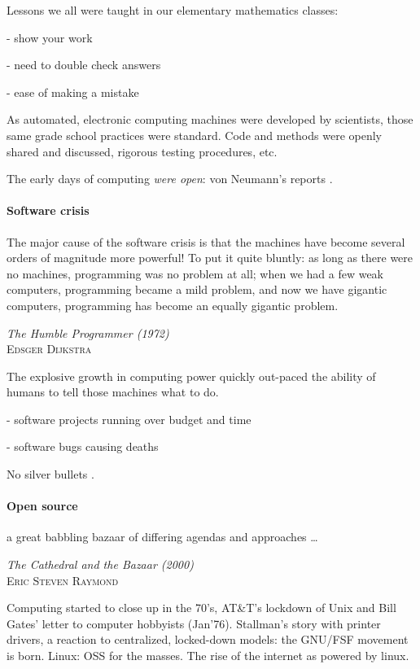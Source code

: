 \documentclass[ChapterTOCs,krantz2]{krantz} %
\begin{document}
Lessons we all were taught in our elementary mathematics classes:

- show your work

- need to double check answers

- ease of making a mistake

As automated, electronic computing machines were developed by scientists,
those same grade school practices were standard.  Code and methods were
openly shared and discussed, rigorous testing procedures, etc.

The early days of computing \emph{were open}: von Neumann's reports
\cite{grcar2011john}.

\paragraph{ {\bf Software crisis}}

\setlength{\epigraphrule}{0pt}
\setlength{\epigraphwidth}{.65\textwidth}
\epigraph%
{%
  The major cause of the software crisis is that the machines have become
  several orders of magnitude more powerful! To put it quite bluntly: as long
  as there were no machines, programming was no problem at all; when we had a
  few weak computers, programming became a mild problem, and now we have
  gigantic computers, programming has become an equally gigantic problem.
}%
{\textit{The Humble Programmer (1972)}\\ \textsc{Edsger Dijkstra} }

The explosive growth in computing power quickly out-paced the ability
of humans to tell those machines what to do.

- software projects running over budget and time

- software bugs causing deaths

No silver bullets \cite{brooks1995mythical}.

\paragraph{ {\bf Open source}}

\setlength{\epigraphrule}{0pt}
\setlength{\epigraphwidth}{.65\textwidth}
\epigraph%
{%
  a great babbling bazaar of differing agendas and approaches \ldots
}%
{\textit{The Cathedral and the Bazaar (2000)}\\ \textsc{Eric Steven Raymond} }

Computing started to close up in the 70's, AT\&T's lockdown of Unix
and Bill Gates' letter to computer hobbyists (Jan'76). Stallman's
story with printer drivers, a reaction to centralized, locked-down
models: the GNU/FSF movement is born. Linux: OSS for the masses. The
rise of the internet as powered by linux.
\end{document}
